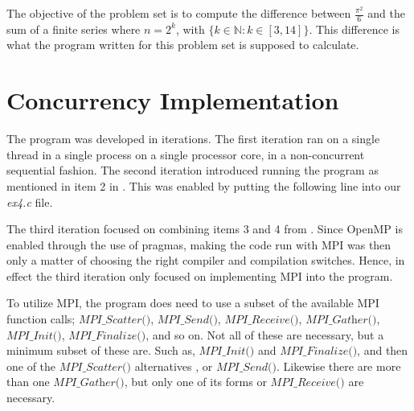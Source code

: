 \documentclass[fontsize=11pt,paper=a4,titlepage]{report}
\begin{document}
The objective of the problem set is to compute the difference between
$\frac{\pi^2}{6}$ and the sum of a finite series where $n = 2^k$, with $\{k \in
\mathbb{N} : k \in [3, 14]\}$. This difference is what the program written for
this problem set is supposed to calculate.

\section{Concurrency Implementation}

The program was developed in iterations. The first iteration ran on a single
thread in a single process on a single processor core, in a non-concurrent
sequential fashion. The second iteration introduced running the program as
mentioned in item 2 in \cite{RunMode}. This was enabled by putting the following
line into our \textit{ex4.c} file.


The third iteration focused on combining items 3 and 4 from \cite{RunMode}.
Since OpenMP is enabled through the use of pragmas, making the code run with MPI
was then only a matter of choosing the right compiler and compilation switches.
Hence, in effect the third iteration only focused on implementing MPI into the
program.

To utilize MPI, the program does need to use a subset of the available MPI
function calls; $\textit{MPI\_Scatter()}$, $\textit{MPI\_Send()}$,
$\textit{MPI\_Receive()}$, $\textit{MPI\_Gather()}$, $\textit{MPI\_Init()}$,
$\textit{MPI\_Finalize()}$, and so on. Not all of these are necessary, but a
minimum subset of these are. Such as, $\textit{MPI\_Init()}$ and $\textit{
MPI\_Finalize()}$, and then one of the $\textit{MPI\_Scatter()}$ alternatives ,
or $\textit{MPI\_Send()}$. Likewise there are more than one
$\textit{MPI\_Gather()}$, but only one of its forms or $\textit{MPI\_Receive()}$
are necessary.





% 
% 
% 
% 

\listoffigures
\listoftables
\end{document}
